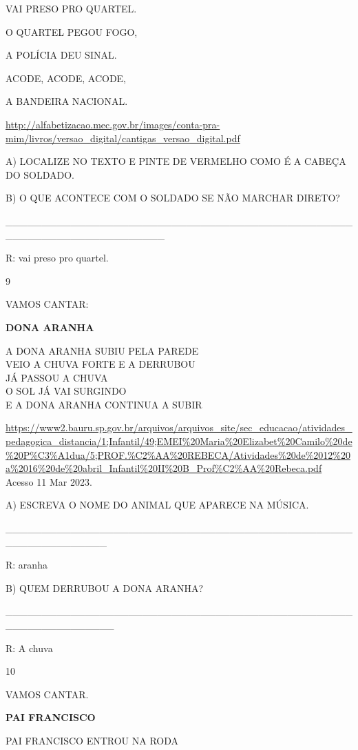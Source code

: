 {{{VAI PRESO PRO QUARTEL.

O QUARTEL PEGOU FOGO,

A POLÍCIA DEU SINAL.

ACODE, ACODE, ACODE,

A BANDEIRA NACIONAL.

\url{http://alfabetizacao.mec.gov.br/images/conta-pra-mim/livros/versao_digital/cantigas_versao_digital.pdf}

A) LOCALIZE NO TEXTO E PINTE DE VERMELHO COMO É A CABEÇA DO SOLDADO.

B) O QUE ACONTECE COM O SOLDADO SE NÃO MARCHAR DIRETO?

\_\_\_\_\_\_\_\_\_\_\_\_\_\_\_\_\_\_\_\_\_\_\_\_\_\_\_\_\_\_\_\_\_\_\_\_\_\_\_\_\_\_\_\_\_\_\_\_\_\_\_\_\_\_\_\_\_\_\_\_\_\_\_\_\_\_\_\_\_\_

R: vai preso pro quartel.

\num{9}

VAMOS CANTAR:

\textbf{DONA ARANHA}

A DONA ARANHA SUBIU PELA PAREDE\\
VEIO A CHUVA FORTE E A DERRUBOU\\
JÁ PASSOU A CHUVA\\
O SOL JÁ VAI SURGINDO\\
E A DONA ARANHA CONTINUA A SUBIR

\url{https://www2.bauru.sp.gov.br/arquivos/arquivos_site/sec_educacao/atividades_pedagogica_distancia/1;Infantil/49;EMEI\%20Maria\%20Elizabet\%20Camilo\%20de\%20P\%C3\%A1dua/5;PROF.\%C2\%AA\%20REBECA/Atividades\%20de\%2012\%20a\%2016\%20de\%20abril_Infantil\%20II\%20B_Prof\%C2\%AA\%20Rebeca.pdf}
Acesso 11 Mar 2023.

A) ESCREVA O NOME DO ANIMAL QUE APARECE NA MÚSICA.

\_\_\_\_\_\_\_\_\_\_\_\_\_\_\_\_\_\_\_\_\_\_\_\_\_\_\_\_\_\_\_\_\_\_\_\_\_\_\_\_\_\_\_\_\_\_\_\_\_\_\_\_\_\_\_\_\_\_\_\_\_\_

R: aranha

B) QUEM DERRUBOU A DONA ARANHA?

\_\_\_\_\_\_\_\_\_\_\_\_\_\_\_\_\_\_\_\_\_\_\_\_\_\_\_\_\_\_\_\_\_\_\_\_\_\_\_\_\_\_\_\_\_\_\_\_\_\_\_\_\_\_\_\_\_\_\_\_\_\_\_

R: A chuva

\num{10}

VAMOS CANTAR.

\textbf{PAI FRANCISCO}

PAI FRANCISCO ENTROU NA RODA

}}}
